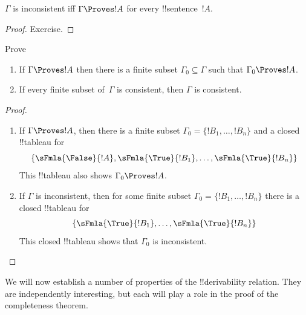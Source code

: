 \begin{prop}
$\Gamma$ is inconsistent iff $\Gamma \Proves !A$ for every
  !!{sentence}~$!A$.
\end{prop}

\begin{proof}
Exercise.
\end{proof}




\begin{prob}
Prove 
\end{prob}


\begin{prop}[Compactness]
  \begin{enumerate}
  \item If $\Gamma \Proves !A$ then there is a finite subset $\Gamma_0
    \subseteq \Gamma$ such that $\Gamma_0 \Proves !A$.
  \item If every finite subset of~$\Gamma$ is
    consistent, then $\Gamma$ is consistent.
  \end{enumerate}
\end{prop}

\begin{proof}
  \begin{enumerate}
    \item If $\Gamma \Proves !A$, then there is a finite subset
      $\Gamma_0 = \{!B_1, \dots, !B_n\}$ and a closed !!{tableau} for
      \[
      \{\sFmla{\False}{!A}, \sFmla{\True}{!B_1}, \dots, \sFmla{\True}{!B_n}\}
      \]
      This !!{tableau} also shows $\Gamma_0 \Proves !A$.
    \item If $\Gamma$ is inconsistent, then for some finite subset
      $\Gamma_0 = \{!B_1, \dots, !B_n\}$ there is a closed !!{tableau}
      for
      \[
      \{\sFmla{\True}{!B_1}, \dots, \sFmla{\True}{!B_n}\}
      \]
      This closed !!{tableau} shows that $\Gamma_0$ is inconsistent.
  \end{enumerate}
\end{proof}







We will now establish a number of properties of the !!{derivability}
relation.  They are independently interesting, but each will play a
role in the proof of the completeness theorem.

